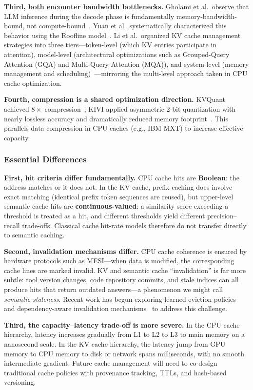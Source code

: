 \documentclass[11pt,a4paper]{article}
\begin{document}
\textbf{Third, both encounter bandwidth bottlenecks.}
Gholami et al.\ observe that LLM inference during the decode phase is fundamentally memory-bandwidth-bound, not compute-bound~\cite{gholami2024memorywall}.
Yuan et al.\ systematically characterized this behavior using the Roofline model~\cite{yuan2024llminference}.
Li et al.\ organized KV cache management strategies into three tiers---token-level (which KV entries participate in attention), model-level (architectural optimizations such as Grouped-Query Attention (GQA) and Multi-Query Attention (MQA)), and system-level (memory management and scheduling)~\cite{likvcache2024survey}---mirroring the multi-level approach taken in CPU cache optimization.

\textbf{Fourth, compression is a shared optimization direction.}
KVQuant achieved $8\times$ compression~\cite{hooper2024kvquant}; KIVI applied asymmetric 2-bit quantization with nearly lossless accuracy and dramatically reduced memory footprint~\cite{liu2024kivi}.
This parallels data compression in CPU caches (e.g., IBM MXT) to increase effective capacity.

\subsubsection{Essential Differences}

\textbf{First, hit criteria differ fundamentally.}
CPU cache hits are \textbf{Boolean}: the address matches or it does not.
In the KV cache, prefix caching does involve exact matching (identical prefix token sequences are reused), but upper-level semantic cache hits are \textbf{continuous-valued}: a similarity score exceeding a threshold is treated as a hit, and different thresholds yield different precision--recall trade-offs.
Classical cache hit-rate models therefore do not transfer directly to semantic caching.

\textbf{Second, invalidation mechanisms differ.}
CPU cache coherence is ensured by hardware protocols such as MESI---when data is modified, the corresponding cache lines are marked invalid.
KV and semantic cache ``invalidation'' is far more subtle: tool version changes, code repository commits, and stale indices can all produce hits that return outdated answers---a phenomenon we might call \textit{semantic staleness}.
Recent work has begun exploring learned eviction policies~\cite{lpc2025} and dependency-aware invalidation mechanisms~\cite{multilevelcache2025} to address this challenge.

\textbf{Third, the capacity--latency trade-off is more severe.}
In the CPU cache hierarchy, latency increases gradually from L1 to L2 to L3 to main memory on a nanosecond scale.
In the KV cache hierarchy, the latency jump from GPU memory to CPU memory to disk or network spans milliseconds, with no smooth intermediate gradient.
Future cache management will need to co-design traditional cache policies with provenance tracking, TTLs, and hash-based versioning.
\end{document}
